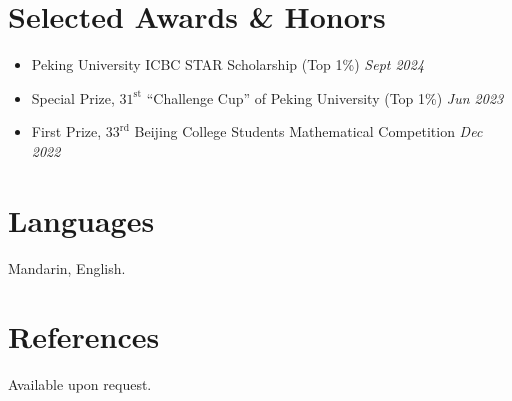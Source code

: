 \documentclass[letterpaper,11pt]{article}
\begin{document}
\section*{Selected Awards \& Honors}
\begin{itemize}[leftmargin=1.5em, noitemsep, topsep=4pt]
    \item Peking University ICBC STAR Scholarship (Top 1\%) \hfill \textit{Sept 2024}
    \item Special Prize, $31^{\mathrm{st}}$ ``Challenge Cup'' of Peking University (Top 1\%) \hfill \textit{Jun 2023}
    \item First Prize, $33^{\mathrm{rd}}$ Beijing College Students Mathematical Competition \hfill \textit{Dec 2022}
\end{itemize}

\section*{Languages}
Mandarin, English.

\section*{References}
\noindent Available upon request.
\end{document}
